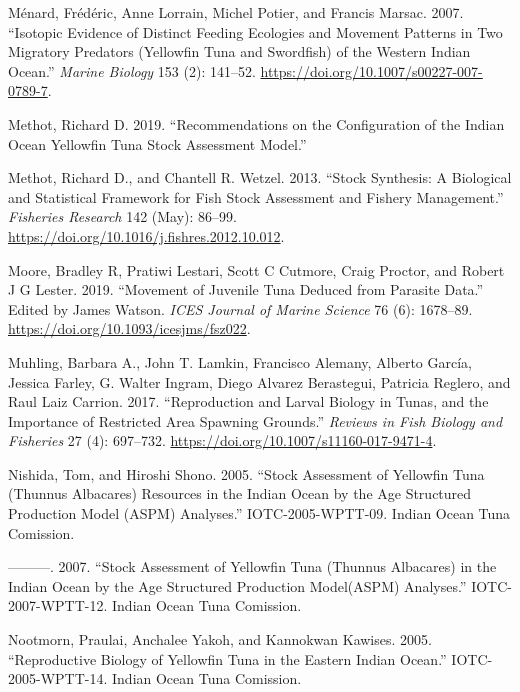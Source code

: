 \documentclass[
]{scrartcl}
\newlength{\cslhangindent}
\newenvironment{CSLReferences}[2] %
 {\begin{list}{}{%
  \setlength{\itemindent}{0pt}
  \setlength{\leftmargin}{0pt}
  \setlength{\parsep}{0pt}
  \ifodd #1
   \setlength{\leftmargin}{\cslhangindent}
   \setlength{\itemindent}{-1\cslhangindent}
  \fi
  \setlength{\itemsep}{#2\baselineskip}}}
 {\end{list}}
\begin{document}
\begin{CSLReferences}{1}{0}
Ménard, Frédéric, Anne Lorrain, Michel Potier, and Francis Marsac. 2007.
{``Isotopic Evidence of Distinct Feeding Ecologies and Movement Patterns
in Two Migratory Predators (Yellowfin Tuna and Swordfish) of the Western
{Indian Ocean}.''} \emph{Marine Biology} 153 (2): 141--52.
\url{https://doi.org/10.1007/s00227-007-0789-7}.

Methot, Richard D. 2019. {``Recommendations on the Configuration of the
{Indian Ocean} Yellowfin Tuna Stock Assessment Model.''}

Methot, Richard D., and Chantell R. Wetzel. 2013. {``Stock Synthesis:
{A} Biological and Statistical Framework for Fish Stock Assessment and
Fishery Management.''} \emph{Fisheries Research} 142 (May): 86--99.
\url{https://doi.org/10.1016/j.fishres.2012.10.012}.

Moore, Bradley R, Pratiwi Lestari, Scott C Cutmore, Craig Proctor, and
Robert J G Lester. 2019. {``Movement of Juvenile Tuna Deduced from
Parasite Data.''} Edited by James Watson. \emph{ICES Journal of Marine
Science} 76 (6): 1678--89. \url{https://doi.org/10.1093/icesjms/fsz022}.

Muhling, Barbara A., John T. Lamkin, Francisco Alemany, Alberto García,
Jessica Farley, G. Walter Ingram, Diego Alvarez Berastegui, Patricia
Reglero, and Raul Laiz Carrion. 2017. {``Reproduction and Larval Biology
in Tunas, and the Importance of Restricted Area Spawning Grounds.''}
\emph{Reviews in Fish Biology and Fisheries} 27 (4): 697--732.
\url{https://doi.org/10.1007/s11160-017-9471-4}.

Nishida, Tom, and Hiroshi Shono. 2005. {``Stock Assessment of Yellowfin
Tuna ({Thunnus} Albacares) Resources in the {Indian Ocean} by the Age
Structured Production Model ({ASPM}) Analyses.''} IOTC-2005-WPTT-09.
Indian Ocean Tuna Comission.

---------. 2007. {``Stock Assessment of Yellowfin Tuna ({Thunnus}
Albacares) in the {Indian Ocean} by the Age Structured Production
Model({ASPM}) Analyses.''} IOTC-2007-WPTT-12. Indian Ocean Tuna
Comission.

Nootmorn, Praulai, Anchalee Yakoh, and Kannokwan Kawises. 2005.
{``Reproductive Biology of Yellowfin Tuna in the Eastern {Indian
Ocean}.''} IOTC-2005-WPTT-14. Indian Ocean Tuna Comission.


\end{CSLReferences}
\end{document}
